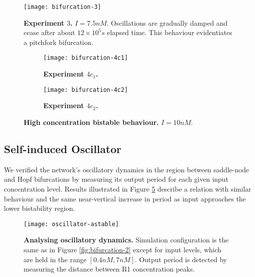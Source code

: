     \begin{figure}[!htbp]
      \centering
      \texttt{[image: bifurcation-3]}
      \caption{\textbf{Experiment $3$.} $I = 7.5nM$. Oscillations are gradually damped and cease after about $12 \times 10^5 s$ elapsed time. This behaviour evidentiates a pitchfork bifurcation.}
      \label{fig:bifurcation-3}
    \end{figure}

    \begin{figure}[!htb]
      \centering
      \begin{subfigure}[t]{0.7\textwidth}
        \centering
        \texttt{[image: bifurcation-4c1]}
        \caption{\textbf{Experiment $4c_{1}$.}}
        \label{fig:bifurcation-4c1}
      \end{subfigure}
      \begin{subfigure}[t]{0.7\textwidth}
        \centering
        \texttt{[image: bifurcation-4c2]}
        \caption{\textbf{Experiment $4c_{2}$.}}
        \label{fig:bifurcation-4c2}
      \end{subfigure}
      \caption{\textbf{High concentration bistable behaviour.} $I = 10 nM$.}
      \label{fig:bifurcation-4}
    \end{figure}


  \subsection{Self-induced Oscillator}

    We verified the network's oscillatory dynamics in the region between saddle-node and Hopf bifurcations by measuring its output period for each given input concentration level.
    Results illustrated in Figure \ref{fig:oscillator-astable} describe a relation with similar behaviour and the same near-vertical increase in period as input approaches the lower bistability region.

    \begin{figure}[!htb]
      \centering
      \texttt{[image: oscillator-astable]}
      \caption{\textbf{Analysing oscillatory dynamics.} Simulation configuration is the same as in Figure \ref{fig:bifurcation-2} except for input levels, which are held in the range $[0.4 nM, 7 nM]$. Output period is detected by measuring the distance between R1 concentration peaks.}
      \label{fig:oscillator-astable}
    \end{figure}


